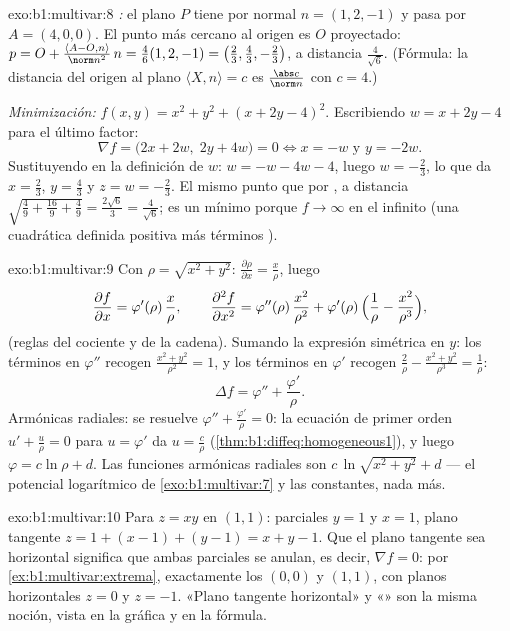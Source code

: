 \begin{solution}{exo:b1:multivar:8}
\emph{:} el plano $P$ tiene por normal $n = (1, 2, -1)$ y
pasa por $A = (4, 0, 0)$. El punto más cercano al origen es
$O$ proyectado: $p = O + \frac{\langle A - O, n\rangle}{\norm
n^2}\,n = \frac{4}{6}(1,2,-1) = \bigl(\frac23, \frac43,
-\frac23\bigr)$, a distancia $\frac{4}{\sqrt 6}$. (Fórmula: la distancia
del origen al plano $\langle X, n \rangle = c$ es
$\frac{\abs c}{\norm n}$ con $c = 4$.)

\emph{Minimización:} $f(x,y) = x^2 + y^2 + (x + 2y - 4)^2$. Escribiendo
$w = x + 2y - 4$ para el último factor:
\[
\nabla f = \bigl(2x + 2w,\; 2y + 4w\bigr) = 0
\iff x = -w \text{ y } y = -2w .
\]
Sustituyendo en la definición de $w$: $w = -w - 4w - 4$, luego $w =
-\frac23$, lo que da $x = \frac23$, $y = \frac43$ y $z = w =
-\frac23$. El mismo punto que por , a distancia
$\sqrt{\frac49 + \frac{16}{9} + \frac49} = \frac{2\sqrt 6}{3} =
\frac{4}{\sqrt6}$; es un mínimo porque $f \to \infty$ en el infinito
(una cuadrática definida positiva más términos ).
\end{solution}

\begin{solution}{exo:b1:multivar:9}
Con $\rho = \sqrt{x^2+y^2}$: $\frac{\partial \rho}{\partial x} =
\frac{x}{\rho}$, luego
\[
\frac{\partial f}{\partial x} = \varphi'(\rho)\,\frac{x}{\rho},
\qquad
\frac{\partial^2 f}{\partial x^2}
= \varphi''(\rho)\,\frac{x^2}{\rho^2}
+ \varphi'(\rho)\,\Bigl(\frac{1}{\rho} -
\frac{x^2}{\rho^3}\Bigr),
\]
(reglas del cociente y de la cadena). Sumando la expresión simétrica en $y$:
los términos en $\varphi''$ recogen $\frac{x^2 + y^2}{\rho^2} = 1$, y los
términos en $\varphi'$ recogen $\frac{2}{\rho} - \frac{x^2 +
y^2}{\rho^3} = \frac{1}{\rho}$:
\[
\Delta f = \varphi'' + \frac{\varphi'}{\rho} .
\]
Armónicas radiales: se resuelve $\varphi'' + \frac{\varphi'}{\rho} = 0$: la
ecuación de primer orden $u' + \frac u\rho = 0$ para $u = \varphi'$
da $u = \frac{c}{\rho}$ (\cref{thm:b1:diffeq:homogeneous1}),
y luego $\varphi = c\ln\rho + d$. Las funciones armónicas radiales son
$c\,\ln\sqrt{x^2 + y^2} + d$ --- el potencial logarítmico de
\cref{exo:b1:multivar:7} y las constantes, nada más.
\end{solution}

\begin{solution}{exo:b1:multivar:10}
Para $z = xy$ en $(1,1)$: parciales $y = 1$ y $x = 1$, plano
tangente $z = 1 + (x - 1) + (y - 1) = x + y - 1$. Que el plano
tangente sea horizontal significa que ambas parciales se anulan, es decir, $\nabla f = 0$:
por \cref{ex:b1:multivar:extrema}, exactamente los 
$(0, 0)$ y $(1, 1)$, con planos horizontales $z = 0$ y $z =
-1$. «Plano tangente horizontal» y «» son la
misma noción, vista en la gráfica y en la fórmula.
\end{solution}

